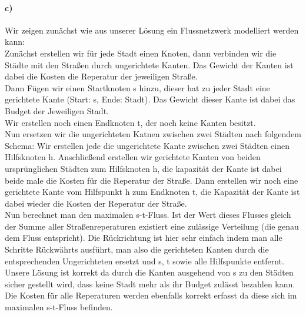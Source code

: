 \documentclass[a4paper]{article}
\begin{document}
\paragraph{c)}
Wir zeigen zunächst wie aus unserer Lösung ein Flussnetzwerk modelliert werden kann: \\
Zunächst erstellen wir für jede Stadt einen Knoten, dann verbinden wir die Städte mit 
den Straßen durch ungerichtete Kanten. Das Gewicht der Kanten ist dabei die Kosten 
die Reperatur der jeweiligen Straße. \\
Dann Fügen wir einen Startknoten s hinzu, dieser hat zu jeder Stadt eine gerichtete
Kante (Start: s, Ende: Stadt). Das Gewicht dieser Kante ist dabei das Budget der 
Jeweiligen Stadt. \\
Wir erstellen noch einen Endknoten t, der noch keine Kanten besitzt. \\
Nun ersetzen wir die ungerichteten Katnen zwischen zwei Städten nach folgendem Schema:
Wir erstellen jede die ungerichtete Kante zwischen zwei Städten einen Hilfsknoten h.
Anschließend erstellen wir gerichtete Kanten von beiden ursprünglichen Städten 
zum Hilfsknoten h, die kapazität der Kante ist dabei beide male die Kosten 
für die Reperatur der Straße. Dann erstellen wir noch eine gerichtete Kante vom 
Hilfspunkt h zum Endknoten t, die Kapazität der Kante ist dabei wieder die Kosten 
der Reperatur der Straße. \\
Nun berechnet man den maximalen s-t-Fluss. Ist der Wert dieses Flusses gleich der 
Summe aller Straßenreperaturen existiert eine zulässige Verteilung (die genau dem
Fluss entspricht). Die Rückrichtung ist hier sehr einfach indem man alle Schritte
Rückwährts ausführt, man also die gerichteten Kanten durch die entsprechenden 
Ungerichteten ersetzt und s, t sowie alle Hilfspunkte entfernt. \\
Unsere Lösung ist korrekt da durch die Kanten ausgehend von s zu den Städten
sicher gestellt wird, dass keine Stadt mehr als ihr Budget zulässt bezahlen kann. \\
Die Kosten für alle Reperaturen werden ebenfalls korrekt erfasst da diese sich 
im maximalen s-t-Fluss befinden.
\end{document}
